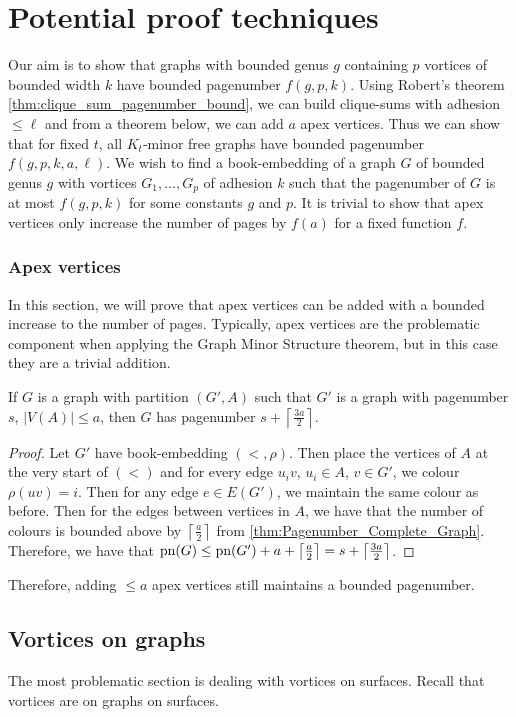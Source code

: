 
\chapter{Potential proof techniques}\label{chap:Proving_The_Theorem}
Our aim is to show that graphs with bounded genus $g$ containing $p$ vortices of bounded width $k$ have bounded pagenumber $f(g, p, k)$.
Using Robert's theorem \cref{thm:clique_sum_pagenumber_bound}, we can build clique-sums with adhesion $\leq \ell$ and from a theorem below, we can add $a$ apex vertices. 
Thus we can show that for fixed $t$, all $K_t$-minor free graphs have bounded pagenumber $f(g, p, k, a, \ell)$. 
We wish to find a book-embedding of a graph $G$ of bounded genus $g$ with vortices $G_1, ..., G_p$ of adhesion $k$ such that the pagenumber of $G$ is at most $f(g, p, k)$ for some constants $g$ and $p$. It is trivial to show that apex vertices only increase the number of pages by $f(a)$ for a fixed function $f$. 
\subsection{Apex vertices}
In this section, we will prove that apex vertices can be added with a bounded increase to the number of pages. Typically, apex vertices are the problematic component when applying the Graph Minor Structure theorem, but in this case they are a trivial addition.
\begin{theorem}
	If $G$ is a graph with partition $(G', A)$ such that $G'$ is a graph with pagenumber $s$, $|V(A)| \leq a$, then $G$ has pagenumber $s + \left\lceil \frac{3a}{2}\right\rceil$. 
\end{theorem}
\begin{proof}
	Let $G'$ have book-embedding $(<, \rho)$. Then place the vertices of $A$ at the very start of $(<)$ and for every edge $u_iv$, $u_i \in A$, $v \in G'$, we colour $\rho(uv) = i$. Then for any edge $e \in E(G')$, we maintain the same colour as before. Then for the edges between vertices in $A$, we have that the number of colours is bounded above by $\left\lceil \frac{a}{2} \right\rceil$ from \cref{thm:Pagenumber_Complete_Graph}. Therefore, we have that $\text{pn}(G) \leq \text{pn}(G') + a + \left\lceil \frac{a}{2} \right\rceil =s + \left\lceil \frac{3a}{2}\right\rceil$. 
\end{proof}

Therefore, adding $ \leq a$ apex vertices still maintains a bounded pagenumber.

\section{Vortices on graphs}
The most problematic section is dealing with vortices on surfaces. Recall that vortices are on graphs on surfaces. 

